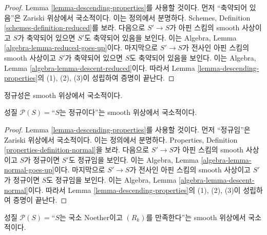 \begin{proof}
Lemma \ref{lemma-descending-properties}를 사용할 것이다. 먼저 ``축약되어
있음''은 Zariski 위상에서 국소적이다. 이는 정의에서 분명하다. Schemes,
Definition \ref{schemes-definition-reduced}를 보라. 다음으로 $S' \to S$가
아핀 스킴의 smooth 사상이고 $S$가 축약되어 있으면 $S'$도 축약되어 있음을
보인다. 이는 Algebra, Lemma \ref{algebra-lemma-reduced-goes-up}이다.
마지막으로 $S' \to S$가 전사인 아핀 스킴의 smooth 사상이고 $S'$가
축약되어 있으면 $S$도 축약되어 있음을 보인다. 이는 Algebra, Lemma
\ref{algebra-lemma-descent-reduced}이다. 따라서 Lemma
\ref{lemma-descending-properties}의 (1), (2), (3)이 성립하여 증명이 끝난다.
\end{proof}

\begin{lemma}
\label{lemma-normal-local-smooth}
\begin{slogan}
정규성은 smooth 위상에서 국소적이다.
\end{slogan}
성질 $\mathcal{P}(S) =$``$S$는 정규이다''는 smooth 위상에서 국소적이다.
\end{lemma}

\begin{proof}
Lemma \ref{lemma-descending-properties}를 사용할 것이다. 먼저 ``정규임''은
Zariski 위상에서 국소적이다. 이는 정의에서 분명하다. Properties,
Definition \ref{properties-definition-normal}을 보라. 다음으로 $S' \to S$가
아핀 스킴의 smooth 사상이고 $S$가 정규이면 $S'$도 정규임을 보인다. 이는
Algebra, Lemma \ref{algebra-lemma-normal-goes-up}이다. 마지막으로
$S' \to S$가 전사인 아핀 스킴의 smooth 사상이고 $S'$가 정규이면 $S$도
정규임을 보인다. 이는 Algebra, Lemma \ref{algebra-lemma-descent-normal}이다.
따라서 Lemma \ref{lemma-descending-properties}의 (1), (2), (3)이 성립하여
증명이 끝난다.
\end{proof}

\begin{lemma}
\label{lemma-Rk-local-smooth}
성질 $\mathcal{P}(S) =$``$S$는 국소 Noether이고 $(R_k)$를 만족한다''는
smooth 위상에서 국소적이다.
\end{lemma}

